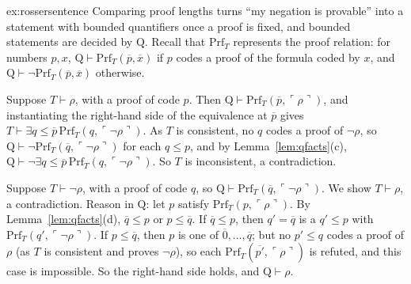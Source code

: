 \begin{solution}{ex:rossersentence}
\idea Comparing proof lengths turns ``my negation is provable'' into a statement with bounded quantifiers once a proof is fixed, and bounded statements are decided by $\mathrm Q$.
\writeup Recall that $\mathrm{Prf}_T$ represents the proof relation: for numbers $p,x$, $\mathrm Q\vdash\mathrm{Prf}_T(\overline p,\overline x)$ if $p$ codes a proof of the formula coded by $x$, and $\mathrm Q\vdash\neg\mathrm{Prf}_T(\overline p,\overline x)$ otherwise.

Suppose $T\vdash\rho$, with a proof of code $p$. Then $\mathrm Q\vdash\mathrm{Prf}_T(\overline p,\ulcorner\rho\urcorner)$, and instantiating the right-hand side of the equivalence at $\overline p$ gives $T\vdash\exists q\le\overline p\,\mathrm{Prf}_T(q,\ulcorner\neg\rho\urcorner)$. As $T$ is consistent, no $q$ codes a proof of $\neg\rho$, so $\mathrm Q\vdash\neg\mathrm{Prf}_T(\overline q,\ulcorner\neg\rho\urcorner)$ for each $q\le p$, and by Lemma~\ref{lem:qfacts}(c), $\mathrm Q\vdash\neg\exists q\le\overline p\,\mathrm{Prf}_T(q,\ulcorner\neg\rho\urcorner)$. So $T$ is inconsistent, a contradiction.

Suppose $T\vdash\neg\rho$, with a proof of code $q$, so $\mathrm Q\vdash\mathrm{Prf}_T(\overline q,\ulcorner\neg\rho\urcorner)$. We show $T\vdash\rho$, a contradiction. Reason in $\mathrm Q$: let $p$ satisfy $\mathrm{Prf}_T(p,\ulcorner\rho\urcorner)$. By Lemma~\ref{lem:qfacts}(d), $\overline q\le p$ or $p\le\overline q$. If $\overline q\le p$, then $q'=\overline q$ is a $q'\le p$ with $\mathrm{Prf}_T(q',\ulcorner\neg\rho\urcorner)$. If $p\le\overline q$, then $p$ is one of $\overline0,\dots,\overline q$; but no $p'\le q$ codes a proof of $\rho$ (as $T$ is consistent and proves $\neg\rho$), so each $\mathrm{Prf}_T(\overline{p'},\ulcorner\rho\urcorner)$ is refuted, and this case is impossible. So the right-hand side holds, and $\mathrm Q\vdash\rho$.
\end{solution}

